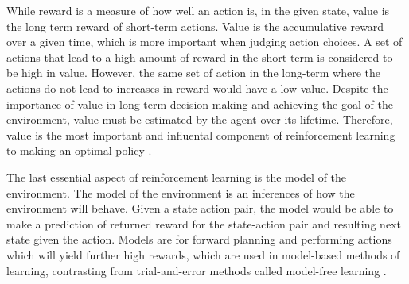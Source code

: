 While reward is a measure of how well an action is, in the given state, value is the long term reward of short-term actions. Value is the accumulative reward over a given time, which is more important when judging action choices. A set of actions that lead to a high amount of reward in the short-term is considered to be high in value. However, the same set of action in the long-term where the actions do not lead to increases in reward would have a low value. Despite the importance of value in long-term decision making and achieving the goal of the environment, value must be estimated by the agent over its lifetime. Therefore, value is the most important and influental component of reinforcement learning to making an optimal policy \cite{Sutton1}. 

The last essential aspect of reinforcement learning is the model of the environment. The model of the environment is an inferences of how the environment will behave. Given a state action pair, the model would be able to make a prediction of returned reward for the state-action pair and resulting next state given the action. Models are for forward planning and performing actions which will yield further high rewards, which are used in model-based methods of learning, contrasting from trial-and-error methods called model-free learning \cite{Sutton1}.